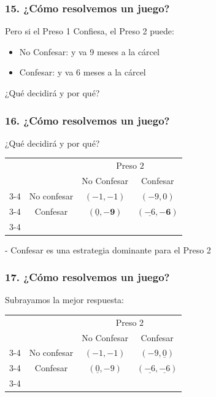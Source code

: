 \documentclass[14pt]{beamer}
\begin{document}
\begin{frame}
\frametitle{15. ¿Cómo resolvemos un juego?}
Pero si el Preso 1 Confiesa, el Preso 2 puede: \vspace{2mm}
\begin{itemize}
    \item  No Confesar: y va 9 meses a la cárcel \\ \vspace{2mm}
    \item Confesar: y va 6 meses a la cárcel
    \\ \vspace{2mm}
\end{itemize}
¿Qué decidirá y por qué?
\end{frame}


\begin{frame}
\frametitle{16. ¿Cómo resolvemos un juego?}
¿Qué decidirá y por qué?
\begin{table}
     \begin{tabular}{cc|c|c|}
      & \multicolumn{1}{c}{} & \multicolumn{2}{c}{Preso $2$}\\
      & \multicolumn{1}{c}{} & \multicolumn{1}{c}{No Confesar}  & \multicolumn{1}{c}{Confesar} \\\cline{3-4}
      \multirow{}{Preso $1$}  & No confesar & $(-1,-1)$ & $(-9,0)$ \\\cline{3-4}
      & Confesar & $(\underline{0},\boldsymbol{-9})$ & $(\underline{-6},\boldsymbol{-6})$ \\\cline{3-4}
    \end{tabular}
  \end{table}
- Confesar es una estrategia dominante para el Preso 2
\end{frame}

\begin{frame}
\frametitle{17. ¿Cómo resolvemos un juego?}
Subrayamos la mejor respuesta:
\begin{table}
     \begin{tabular}{cc|c|c|}
      & \multicolumn{1}{c}{} & \multicolumn{2}{c}{Preso $2$}\\
      & \multicolumn{1}{c}{} & \multicolumn{1}{c}{No Confesar}  & \multicolumn{1}{c}{Confesar} \\\cline{3-4}
      \multirow{}{Preso $1$}  & No confesar & $(-1,-1)$ & $(-9,\underline{0})$ \\\cline{3-4}
      & Confesar & $(\underline{0},-9)$ & $(\underline{-6},\underline{-6})$ \\\cline{3-4}
    \end{tabular}
  \end{table}
\end{frame}
\end{document}

